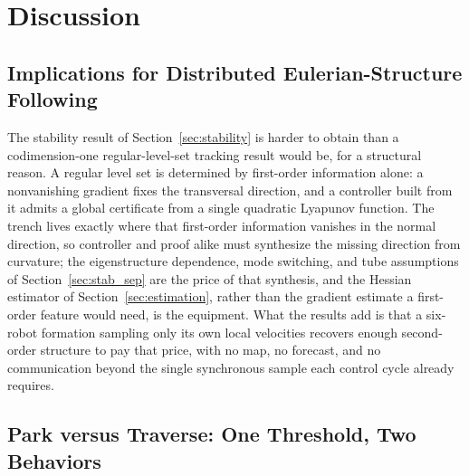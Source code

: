 \documentclass[lettersize,journal]{IEEEtran}
\begin{document}
\section{Discussion}
\label{sec:discussion}

\subsection{Implications for Distributed Eulerian-Structure Following}

The stability result of Section~\ref{sec:stability} is harder to
obtain than a codimension-one regular-level-set tracking result would
be, for a structural reason. A regular level set is determined by
first-order information alone: a nonvanishing gradient fixes the
transversal direction, and a controller built from it admits a global
certificate from a single quadratic Lyapunov function. The trench
lives exactly where that first-order information vanishes in the
normal direction, so controller and proof alike must synthesize the
missing direction from curvature; the eigenstructure dependence, mode
switching, and tube assumptions of Section~\ref{sec:stab_sep} are the
price of that synthesis, and the Hessian estimator of
Section~\ref{sec:estimation}, rather than the gradient estimate a
first-order feature would need, is the equipment. What the results add
is that a six-robot formation sampling only its own local velocities
recovers enough second-order structure to pay that price, with no map,
no forecast, and no communication beyond the single synchronous sample
each control cycle already requires.

\subsection{Park versus Traverse: One Threshold, Two Behaviors}
\label{sec:park_vs_traverse}
\end{document}
